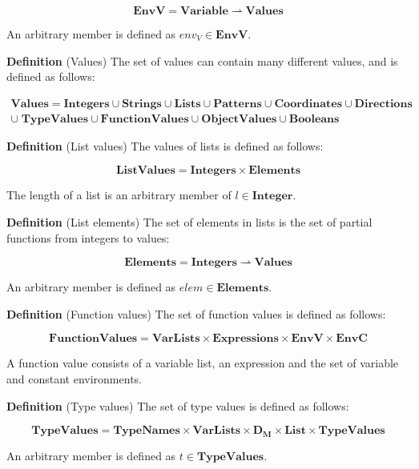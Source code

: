 \[
  \mathbf{EnvV} = \mathbf{Variable} \rightharpoonup \mathbf{Values}
\]


An arbitrary member is defined as $env_{V} \in \mathbf{EnvV}$.

\textbf{Definition} (Values) \hspace{0.5cm} The set of values can contain many
different values, and is defined as follows:

\begin{align*}
 \mathbf{Values} = \mathbf{Integers} \cup \mathbf{Strings} \cup \mathbf{Lists}
 \cup \mathbf{Patterns} \cup \mathbf{Coordinates} \cup \mathbf{Directions}\\ 
 \cup\; \mathbf{TypeValues} \cup \mathbf{FunctionValues} \cup \mathbf{ObjectValues} 
 \cup \mathbf{Booleans}
\end{align*}

\textbf{Definition} (List values) \hspace{0.5cm} The values of lists is
defined as follows:

\[
  \mathbf{ListValues} = \mathbf{Integers} \times \mathbf{Elements}
\]

The length of a list is an arbitrary member of $l \in \mathbf{Integer}$.

\textbf{Definition} (List elements) \hspace{0.5cm} The set of elements in
lists is the set of partial functions from integers to values:

\[
  \mathbf{Elements} = \mathbf{Integers} \rightharpoonup \mathbf{Values}
\]

An arbitrary member is defined as $elem \in \mathbf{Elements}$.

\textbf{Definition} (Function values) \hspace{0.5cm} The set of function values
is defined as follows:
 
\[
  \mathbf{FunctionValues} = \mathbf{VarLists} \times \mathbf{Expressions} \times
  \mathbf{EnvV} \times \mathbf{EnvC}
\]

A function value consists of a variable list, an expression and the set of variable
and constant environments.

\textbf{Definition} (Type values) \hspace{0.5cm} The set of type values is
defined as follows:

\[
  \mathbf{TypeValues} = \mathbf{TypeNames} \times \mathbf{VarLists} \times
  \mathbf{D_{M}} \times \mathbf{List} \times \mathbf{TypeValues }
\]

An arbitrary member is defined as $t \in \mathbf{TypeValues}$.

